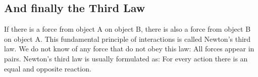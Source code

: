 \documentclass[%
oneside,                 %
final,                   %
10pt]{article}
\begin{document}
\subsection*{And finally the Third Law}

If there is a force from object A on object B, there is also a force from object B on object A.
This fundamental principle of interactions is called Newton’s third law. We do not
know of any force that do not obey this law: All forces appear in pairs. Newton’s
third law is usually formulated as: For every action there is an equal and opposite
reaction.


\end{document}
